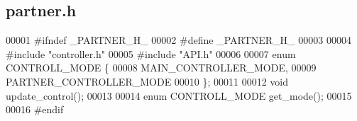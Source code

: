 \subsection{partner.\+h}
\label{partner_8h_source}

\begin{DoxyCode}
00001 \textcolor{preprocessor}{#ifndef \_PARTNER\_H\_}
00002 \textcolor{preprocessor}{#define  \_PARTNER\_H\_}
00003 
00004 \textcolor{preprocessor}{#include "controller.h"}
00005 \textcolor{preprocessor}{#include "API.h"}
00006 
00007 \textcolor{keyword}{enum} CONTROLL_MODE \{
00008   MAIN_CONTROLLER_MODE,
00009   PARTNER_CONTROLLER_MODE
00010 \};
00011 
00012 \textcolor{keywordtype}{void} update_control();
00013 
00014 \textcolor{keyword}{enum} CONTROLL_MODE get_mode();
00015 
00016 \textcolor{preprocessor}{#endif}
\end{DoxyCode}
